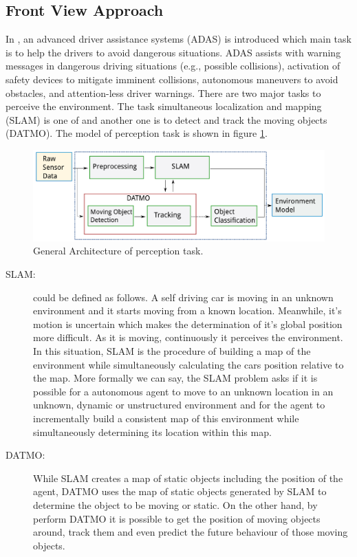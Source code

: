 \subsection{Front View Approach}
In \cite{Chavez_Garcia_2016}, an advanced driver assistance systems (ADAS) is introduced which main task is to help the drivers to avoid dangerous situations. ADAS assists with warning messages in dangerous driving situations (e.g., possible collisions), activation of safety devices to mitigate imminent collisions, autonomous maneuvers to avoid obstacles, and attention-less driver warnings\cite{Chavez_Garcia_2016}. There are two major tasks to perceive the environment. The task simultaneous localization and mapping (SLAM) is one of and another one is to detect and track the moving objects (DATMO). The model of perception task is shown in figure \ref{fig:datmoslam}.
\begin{figure}
  \centering
  \includegraphics[width=.6\textwidth]{src/pic/datmo_slam_arch.png}
  \caption{General Architecture of perception task. \cite{Chavez_Garcia_2016}}
  \label{fig:datmoslam}
\end{figure}
\begin{description}
    \item[SLAM:] could be defined as follows. A self driving car is moving in an unknown environment and it starts moving from a known location. Meanwhile, it's motion is uncertain which makes the determination of it's global position more difficult. As it is moving, continuously it perceives the environment. In this situation, SLAM is the procedure of building a map of the environment while simultaneously calculating the cars position relative to the map\cite{Thrun2008}. More formally we can say, the SLAM problem asks if it is possible for a autonomous agent to move to an unknown location in an unknown, dynamic or unstructured environment and for the agent to incrementally build a consistent map of this environment while simultaneously determining its location within this map\cite{Bailey:1638022}.
    \item[DATMO:] While SLAM creates a map of static objects including the position of the agent, DATMO uses the map  of static objects generated by SLAM \cite{Azim:6232303} to determine the object to be moving or static\cite{vu2008mapping}. On the other hand, by perform DATMO it is possible to get the position of moving objects around, track them and even predict the future behaviour of those moving objects\cite{vu2008mapping}.
\end{description}

